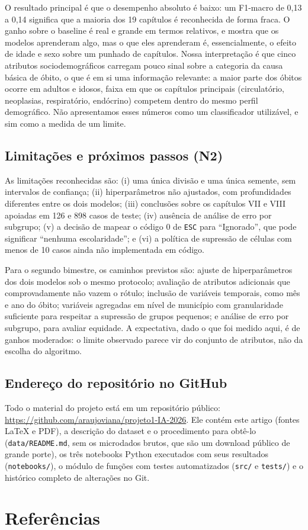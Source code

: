 \documentclass[12pt]{article}
\begin{document}
O resultado principal é que o desempenho absoluto é baixo: um F1-macro de 0,13 a 0,14 significa que a maioria dos 19 capítulos é reconhecida de forma fraca. O ganho sobre o baseline é real e grande em termos relativos, e mostra que os modelos aprenderam algo, mas o que eles aprenderam é, essencialmente, o efeito de idade e sexo sobre um punhado de capítulos. Nossa interpretação é que cinco atributos sociodemográficos carregam pouco sinal sobre a categoria da causa básica de óbito, o que é em si uma informação relevante: a maior parte dos óbitos ocorre em adultos e idosos, faixa em que os capítulos principais (circulatório, neoplasias, respiratório, endócrino) competem dentro do mesmo perfil demográfico. Não apresentamos esses números como um classificador utilizável, e sim como a medida de um limite.

\subsection{Limitações e próximos passos (N2)}

As limitações reconhecidas são: (i) uma única divisão e uma única semente, sem intervalos de confiança; (ii) hiperparâmetros não ajustados, com profundidades diferentes entre os dois modelos; (iii) conclusões sobre os capítulos VII e VIII apoiadas em 126 e 898 casos de teste; (iv) ausência de análise de erro por subgrupo; (v) a decisão de mapear o código 0 de \texttt{ESC} para ``Ignorado'', que pode significar ``nenhuma escolaridade''; e (vi) a política de supressão de células com menos de 10 casos ainda não implementada em código.

Para o segundo bimestre, os caminhos previstos são: ajuste de hiperparâmetros dos dois modelos sob o mesmo protocolo; avaliação de atributos adicionais que comprovadamente não vazem o rótulo; inclusão de variáveis temporais, como mês e ano do óbito; variáveis agregadas em nível de município com granularidade suficiente para respeitar a supressão de grupos pequenos; e análise de erro por subgrupo, para avaliar equidade. A expectativa, dado o que foi medido aqui, é de ganhos moderados: o limite observado parece vir do conjunto de atributos, não da escolha do algoritmo.

\subsection{Endereço do repositório no GitHub}

Todo o material do projeto está em um repositório público:
\url{https://github.com/araujoviana/projeto1-IA-2026}. Ele contém este artigo
(fontes LaTeX e PDF), a descrição do dataset e o procedimento para obtê-lo
(\texttt{data/README.md}, sem os microdados brutos, que são um download
público de grande porte), os três notebooks Python executados com seus
resultados (\texttt{notebooks/}), o módulo de funções com testes
automatizados (\texttt{src/} e \texttt{tests/}) e o histórico completo de
alterações no Git. 

\section{Referências}



\end{document}
